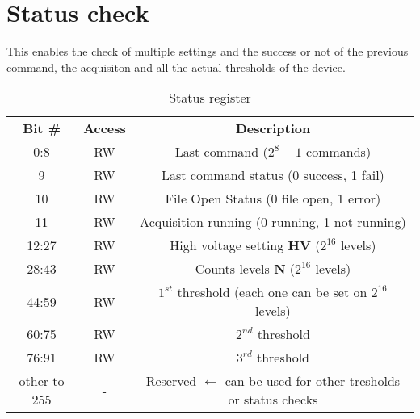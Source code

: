 \documentclass{article}
\begin{document}
\FloatBarrier

\section{Status check}
    This enables the check of multiple settings and the success or not of the previous command, the acquisiton and all the
    actual thresholds of the device.
    \begin{table}[h!]
        \centering
        \begin{tabular}{c|c|c}
            \textbf{Bit \#} & \textbf{Access} & \textbf{Description}\\
            0:8      & RW     & Last command ($2^{8}-1$ commands)\\
            9      & RW     & Last command status (0 success, 1 fail)\\
            10    & RW     & File Open Status (0 file open, 1 error)\\
            11   & RW     & Acquisition running (0 running, 1 not running)\\
            12:27 & RW     & High voltage setting \textbf{HV}  ($2^{16}$ levels)\\
            28:43   & RW   & Counts levels \textbf{N} ($2^{16}$ levels)\\
            44:59 & RW     & $1^{st}$ threshold (each one can be set on $2^{16}$ levels)\\
            60:75 & RW     & $2^{nd}$ threshold\\
            76:91 & RW     & $3^{rd}$ threshold\\
            other to 255 & - & Reserved $\leftarrow$ can be used for other tresholds or status checks\\
        \end{tabular}
        \caption{Status register}
        \label{tab:status}
    \end{table}
\end{document}
